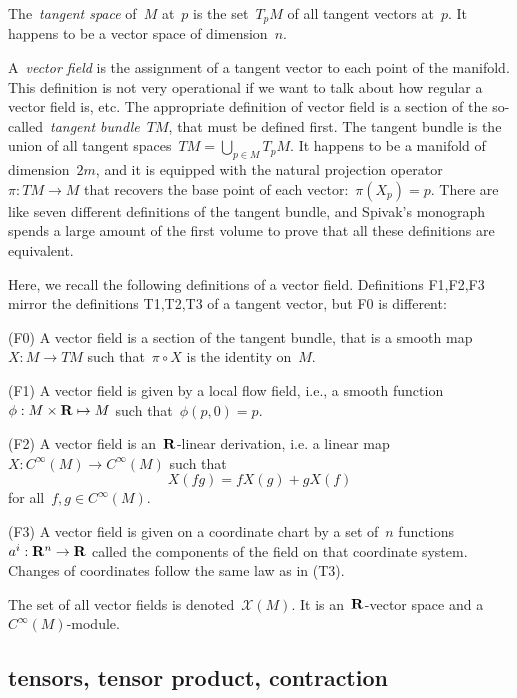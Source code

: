 The~\emph{tangent space} of~$M$ at~$p$ is the set~$T_pM$ of all tangent
vectors at~$p$.  It happens to be a vector space of dimension~$n$.

A~\emph{vector field} is the assignment of a tangent vector to each point of
the manifold.  This definition is not very operational if we want to talk
about how regular a vector field is, etc.  The appropriate definition of
vector field is a section of the so-called~\emph{tangent bundle}~$TM$, that
must be defined first.  The tangent bundle is the union of all tangent
spaces~$TM=\bigcup_{p\in M}T_pM$.  It happens to be a manifold of
dimension~$2m$, and it is equipped with the natural projection
operator~$\pi:TM\to M$ that recovers the base point of each
vector:~$\pi\left(X_p\right)=p$.  There are like seven different definitions
of the tangent bundle, and Spivak's monograph spends a large amount of the
first volume to prove that all these definitions are equivalent.

Here, we recall the following definitions of a vector field.  Definitions
F1,F2,F3 mirror the definitions T1,T2,T3 of a tangent vector, but F0 is
different:

(F0) A vector field is a section of the tangent bundle, that is a
smooth map~$X:M\to TM$ such that~$\pi\circ X$ is the identity on~$M$.

(F1) A vector field is given by a local flow field, i.e., a smooth
function~$\phi:M\times\mathbf{R}\mapsto M$ such that~$\phi(p,0)=p$.

(F2) A vector field is an~$\mathbf{R}$-linear derivation, i.e. a linear
map~$X:C^\infty(M)\to C^\infty(M)$ such that
\[
	X(fg)=fX(g)+gX(f)
\]
for all~$f,g\in C^\infty(M)$.

(F3) A vector field is given on a coordinate chart by a set of~$n$
functions~$a^i:\mathbf{R}^n\to\mathbf{R}$ called the components of the field on that
coordinate system.  Changes of coordinates follow the same law as in (T3).

The set of all vector fields is denoted~$\mathcal{X}(M)$.
It is an~$\mathbf{R}$-vector space and a~$C^\infty(M)$-module.

\subsection{tensors, tensor product, contraction}


